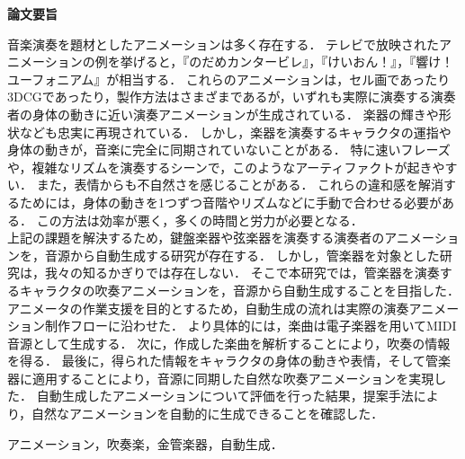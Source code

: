 \begin{center}
{\bf {\large 論文要旨}}
\end{center}

\vspace{3ex}
音楽演奏を題材としたアニメーションは多く存在する．
テレビで放映されたアニメーションの例を挙げると，『のだめカンタービレ』，『けいおん！』，『響け！ユーフォニアム』が相当する．
これらのアニメーションは，セル画であったり3DCGであったり，製作方法はさまざまであるが，いずれも実際に演奏する演奏者の身体の動きに近い演奏アニメーションが生成されている．
楽器の輝きや形状なども忠実に再現されている．
%
しかし，楽器を演奏するキャラクタの運指や身体の動きが，音楽に完全に同期されていないことがある．
特に速いフレーズや，複雑なリズムを演奏するシーンで，このようなアーティファクトが起きやすい．
また，表情からも不自然さを感じることがある．
これらの違和感を解消するためには，身体の動きを1つずつ音階やリズムなどに手動で合わせる必要がある．
この方法は効率が悪く，多くの時間と労力が必要となる．\\
%
\indent
上記の課題を解決するため，鍵盤楽器や弦楽器を演奏する演奏者のアニメーションを，音源から自動生成する研究が存在する．
しかし，管楽器を対象とした研究は，我々の知るかぎりでは存在しない．
そこで本研究では，管楽器を演奏するキャラクタの吹奏アニメーションを，音源から自動生成することを目指した．
アニメータの作業支援を目的とするため，自動生成の流れは実際の演奏アニメーション制作フローに沿わせた．
より具体的には，楽曲は電子楽器を用いてMIDI音源として生成する．
次に，作成した楽曲を解析することにより，吹奏の情報を得る．
最後に，得られた情報をキャラクタの身体の動きや表情，そして管楽器に適用することにより，音源に同期した自然な吹奏アニメーションを実現した．
\indent
自動生成したアニメーションについて評価を行った結果，提案手法により，自然なアニメーションを自動的に生成できることを確認した．

\vspace{4ex}

\noindent
{}

\noindent
アニメーション，吹奏楽，金管楽器，自動生成．